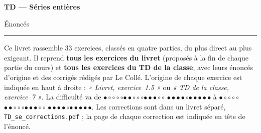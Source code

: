 \documentclass[a4paper,11pt]{article}
\numberwithin{equation}{section}
\numberwithin{figure}{section}
\numberwithin{table}{section}
\theoremstyle{enonce}
\theoremstyle{exemple}
\theoremstyle{remarque}
\newcommand{\niveau}[1]{{\color{Ocre}\footnotesize
  \ifcase#1\or$\bullet\circ\circ\circ\circ$\or$\bullet\bullet\circ\circ\circ$\or$\bullet\bullet\bullet\circ\circ$%
  \or$\bullet\bullet\bullet\bullet\circ$\or$\bullet\bullet\bullet\bullet\bullet$\fi}}
\begin{document}
\thispagestyle{plain}
{\sffamily\small\color{Gris}}\par\vspace{0.2em}
{\sffamily\bfseries\fontsize{26}{30}\selectfont\color{Ink}TD --- Séries entières}\par\vspace{0.3em}
{\sffamily\Large\color{BleuMoyen}Énoncés}\par\vspace{0.4em}
{\color{Ocre}\rule{3.2cm}{1.4pt}}\par\vspace{0.8em}
{\small Ce livret rassemble 33 exercices, classés en quatre parties, du plus direct au plus exigeant.
Il reprend \textbf{tous les exercices du livret} (proposés à la fin de chaque partie du cours) et \textbf{tous les exercices du TD de la
classe}, avec leurs énoncés d'origine et des corrigés rédigés par Le Collé. L'origine de chaque exercice est indiquée en haut à droite :
\emph{« Livret, exercice~1.5 »} ou \emph{« TD de la classe, exercice~7 »}. La difficulté va de \niveau{1} à \niveau{5}.
Les corrections sont dans un livret séparé, \texttt{TD\_se\_corrections.pdf} ; la page de chaque correction est indiquée en tête de l'énoncé.}
\end{document}
